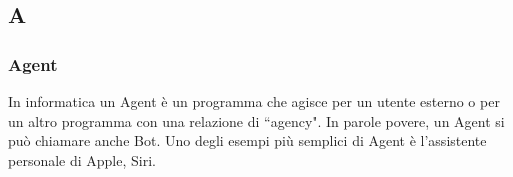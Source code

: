 \subsection*{A} 

\subsubsection*{Agent}

        In informatica un Agent è un programma che agisce per un utente esterno o per un altro programma con una relazione
        di ``agency". In parole povere, un Agent si può chiamare anche Bot.
        Uno degli esempi più semplici di Agent è l'assistente personale di Apple, Siri.